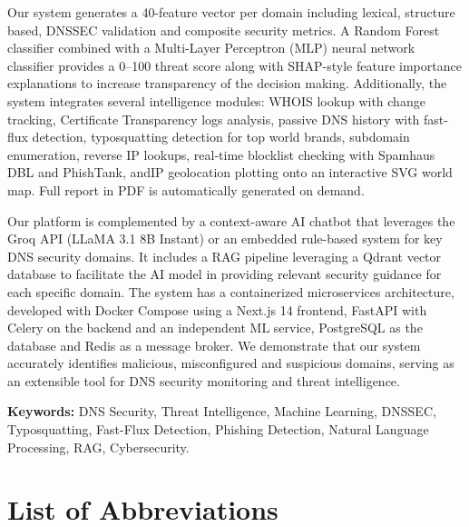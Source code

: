 \documentclass[12pt, a4paper, oneside]{report}
\begin{document}
Our system generates a 40-feature vector per domain including lexical, structure based, DNSSEC validation and composite security metrics. A Random Forest classifier combined with a Multi-Layer Perceptron (MLP) neural network classifier provides a 0--100 threat score along with SHAP-style feature importance explanations to increase transparency of the decision making. Additionally, the system integrates several intelligence modules: WHOIS lookup with change tracking, Certificate Transparency logs analysis, passive DNS history with fast-flux detection, typosquatting detection for top world brands, subdomain enumeration, reverse IP lookups, real-time blocklist checking with Spamhaus DBL and PhishTank, andIP geolocation plotting onto an interactive SVG world map. Full report in PDF is automatically generated on demand.

Our platform is complemented by a context-aware AI chatbot that leverages the Groq API (LLaMA 3.1 8B Instant) or an embedded rule-based system for key DNS security domains. It includes a RAG pipeline leveraging a Qdrant vector database to facilitate the AI model in providing relevant security guidance for each specific domain. The system has a containerized microservices architecture, developed with Docker Compose using a Next.js 14 frontend, FastAPI with Celery on the backend and an independent ML service, PostgreSQL as the database and Redis as a message broker. We demonstrate that our system accurately identifies malicious, misconfigured and suspicious domains, serving as an extensible tool for DNS security monitoring and threat intelligence.

\vspace{0.5cm}
\noindent\textbf{Keywords:} DNS Security, Threat Intelligence, Machine Learning, DNSSEC, Typosquatting, Fast-Flux Detection, Phishing Detection, Natural Language Processing, RAG, Cybersecurity.

\newpage

\tableofcontents
\newpage

\chapter*{List of Abbreviations}
\end{document}
